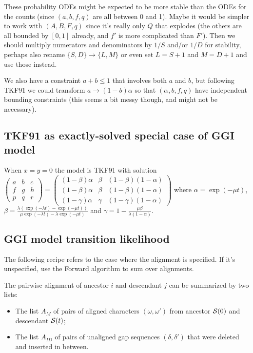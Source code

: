 \documentclass{article}
\begin{document}
These probability ODEs might be expected to be more stable than the ODEs for the counts (since $(a,b,f,q)$ are all between 0 and 1).
Maybe it would be simpler to work with $(A,B,F,q)$ since it's really only $Q$ that explodes (the others are all bounded by $[0,1]$ already, and $f'$ is more complicated than $F'$).
Then we should multiply numerators and denominators by $1/S$ and/or $1/D$ for stability, perhaps also rename $\{S,D\} \to \{L,M\}$
or even set $L=S+1$ and $M=D+1$ and use those instead.

We also have a constraint $a+b \leq 1$ that involves both $a$ and $b$,
but following TKF91 we could transform $a \to (1-b)\alpha$ so that $(\alpha,b,f,q)$ have independent bounding constraints
(this seems a bit messy though, and might not be necessary).


\subsection{TKF91 as exactly-solved special case of GGI model}

When $x=y=0$ the model is TKF91 \cite{ThorneEtAl91}
with solution
$
\begin{pmatrix}
a & b & c \\
f & g & h \\
p & q & r 
\end{pmatrix}
=
\begin{pmatrix}
(1-\beta)\alpha & \beta & (1-\beta)(1-\alpha) \\
(1-\beta)\alpha & \beta & (1-\beta)(1-\alpha) \\
(1-\gamma)\alpha & \gamma & (1-\gamma)(1-\alpha)
\end{pmatrix}
$
where
$\alpha = \exp(-\mu t)$,
$\beta = \frac{\lambda \left( \exp(-\lambda t) - \exp(-\mu t) \right)}{\mu \exp(-\lambda t) - \lambda \exp(-\mu t)}$
and
$\gamma = 1 - \frac{\mu \beta}{\lambda (1 - \alpha)}$.



\subsection{GGI model transition likelihood}

The following recipe refers to the case where the alignment is specified.
If it's unspecified, use the Forward algorithm to sum over alignments.

The pairwise alignment of ancestor $i$ and descendant $j$ can be summarized by two lists:
\begin{itemize}
    \item The list $A_M$ of pairs of aligned characters $(\omega,\omega')$ from ancestor ${\cal S}(0)$ and descendant ${\cal S}(t)$;
    \item The list $A_{ID}$ of pairs of unaligned gap sequences $(\delta,\delta')$ that were deleted and inserted in between.
\end{itemize}
\end{document}

